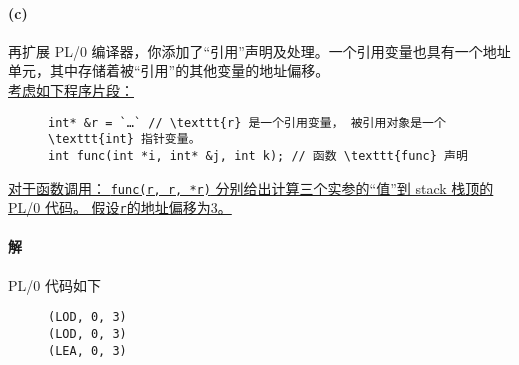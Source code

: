 \documentclass{article}
\begin{document}
\paragraph{(c)}
再扩展 PL/0 编译器，你添加了“引用”声明及处理。一个引用变量也具有一个地址单元，其中存储着被“引用”的其他变量的地址偏移。\\
\uline{考虑如下程序片段：}
\begin{figure}[H]
    \centering
\begin{lstlisting}[style = C]
int* &r = `…` // \texttt{r} 是一个引用变量， 被引用对象是一个 \texttt{int} 指针变量。
int func(int *i, int* &j, int k); // 函数 \texttt{func} 声明
\end{lstlisting}
\end{figure}
\uline{对于函数调用： \lstinline{func(r, r, *r)} 分别给出计算三个实参的“值”到 stack 栈顶的
PL/0 代码。 假设\texttt{r}的地址偏移为3。}

\paragraph{解}
PL/0 代码如下
\begin{figure}[H]
    \begin{lstlisting}[language =  PL/I, alsolanguage = C, frame = single]
(LOD, 0, 3)
(LOD, 0, 3)
(LEA, 0, 3)
    \end{lstlisting}
\end{figure}
\end{document}
